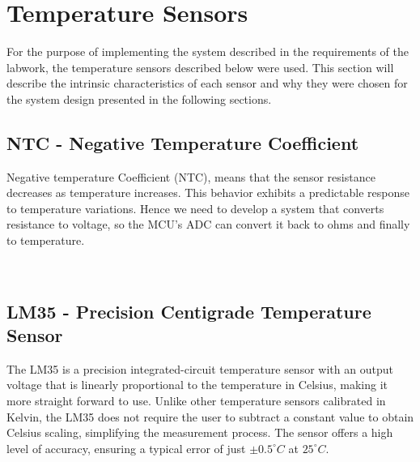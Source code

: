 \documentclass[12pt]{article}
\begin{document}
\pagebreak

\section{Temperature Sensors}
For the purpose of implementing the system described in the requirements of the labwork,
the temperature sensors described below were used. This section will describe the intrinsic
characteristics of each sensor and why they were chosen for the system design presented in the
following sections.
\subsection{NTC - Negative Temperature Coefficient}
    
    Negative temperature Coefficient (NTC), means that the sensor resistance decreases as temperature increases. This behavior exhibits a predictable response to temperature variations. Hence we need to develop a system that converts resistance to voltage, so the MCU's ADC can convert it back to ohms and finally to temperature.

    ~

    \begin{centering}

    \end{centering}

\subsection{LM35 - Precision Centigrade Temperature Sensor}

    The LM35 is a precision integrated-circuit temperature sensor with an output voltage that is linearly proportional to the temperature in Celsius, making it more straight forward to use. Unlike other temperature sensors calibrated in Kelvin, the LM35 does not require the user to subtract a constant value to obtain Celsius scaling, simplifying the measurement process. The sensor offers a high level of accuracy, ensuring a typical error of just $\pm 0.5^\circ C$ at $25^\circ C$.
\end{document}
